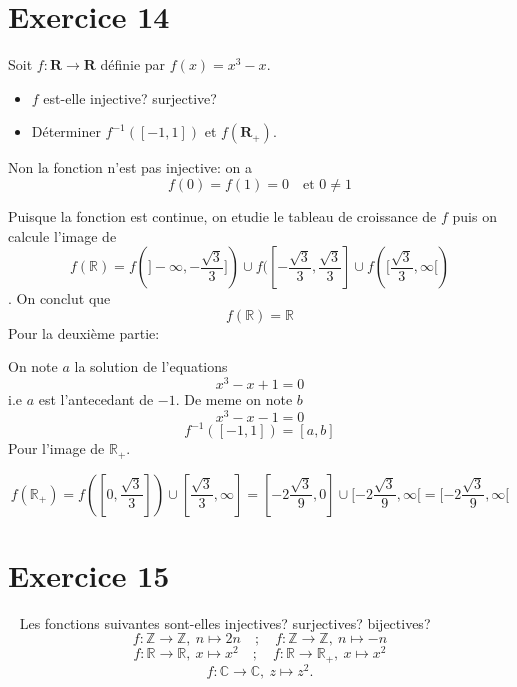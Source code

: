 \documentclass{report}
\begin{document}

\section{Exercice 14}
\qs{}
{

  Soit $f  : \mathbf{R} \rightarrow \mathbf{R}$ d\'efinie par $f(x) = x^3-x$.
\begin{itemize}
  \item $f$ est-elle injective? surjective?
  \item D\'eterminer $f^{-1}([-1,1])$ et $f(\mathbf{R}_+)$.
\end{itemize}
}
\begin{myproof}
 \item  Non la fonction n'est pas injective:
   on a 
   $$
   f(0) = f(1) = 0 \quad \text{et } 0 \ne 1
   $$
 \item Puisque la fonction est continue, on etudie le tableau de croissance de
   $f$ puis on calcule l'image de 
   $$
   f(\mathbb{R}) = f(]-\infty, -\frac{\sqrt{3}}{3}]) \cup
   f([-\frac{\sqrt{3}}{3},\frac{\sqrt{3}}{3}] \cup f([\frac{\sqrt{3}}{3},\infty[)
   $$.
   On conclut que 
   $$
   f(\mathbb{R}) = \mathbb{R}
   $$
   Pour la deuxième partie:

    On note $a$ la solution de l'equations 
    $$
    x^3 - x +1 =0
    $$
    i.e $a$ est l'antecedant de $-1$.
    De meme on note $b$
    $$
    x^3 -x -1 = 0
    $$
   $$
   f^{-1}([-1,1]) = [a,b]
   $$
   Pour l'image de $\mathbb{R}_+$.

   $$
   f(\mathbb{R}_+) = f([0,\frac{\sqrt{3}}{3}])\cup [\frac{\sqrt{3}}{3}, \infty]
   = [-2\frac{\sqrt{3}}{9}, 0] \cup [-2\frac{\sqrt{3}}{9},\infty[ = [-2\frac{\sqrt{3}}{9},\infty[
   $$

\end{myproof}


\section{Exercice 15}
\
\qs{}
{
Les fonctions suivantes sont-elles injectives? surjectives? bijectives?
$$ f : \mathbb{Z}\rightarrow\mathbb{Z}, \ n\mapsto 2n \quad ; \quad f :
\mathbb{Z}\rightarrow\mathbb{Z} ,\ n\mapsto -n $$
$$ f:\mathbb{R}\rightarrow\mathbb{R} ,\ x\mapsto x^2 \quad ; \quad f :
\mathbb{R}\rightarrow\mathbb{R}_+ ,\ x\mapsto x^2 $$
$$   f : \mathbb{C}\rightarrow\mathbb{C} ,\ z\mapsto z^2.$$
}
\end{document}
